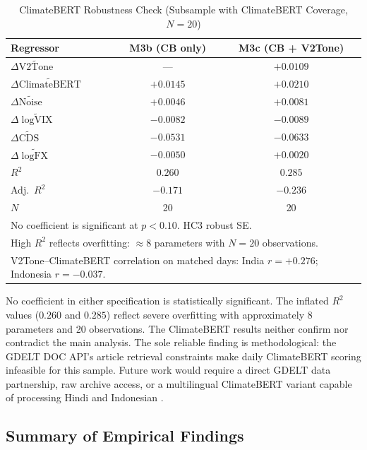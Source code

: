 \documentclass[12pt,a4paper]{article}
\begin{document}
\begin{table}[H]
\centering
\caption{ClimateBERT Robustness Check (Subsample with ClimateBERT Coverage, $N = 20$)}
\label{tab:cb}
\small
\begin{tabular}{lcc}
\toprule
\textbf{Regressor} & \textbf{M3b} (CB only) & \textbf{M3c} (CB + V2Tone) \\
\midrule
$\Delta\widetilde{\text{V2Tone}}$     & ---       & $+0.0109$ \\
$\Delta\widetilde{\text{ClimateBERT}}$ & $+0.0145$ & $+0.0210$ \\
$\Delta\widetilde{\text{Noise}}$      & $+0.0046$ & $+0.0081$ \\
$\Delta\widetilde{\log\text{VIX}}$    & $-0.0082$ & $-0.0089$ \\
$\Delta\widetilde{\text{CDS}}$        & $-0.0531$ & $-0.0633$ \\
$\Delta\widetilde{\log\text{FX}}$     & $-0.0050$ & $+0.0020$ \\
\midrule
$R^2$     & $0.260$ & $0.285$ \\
Adj.\ $R^2$ & $-0.171$ & $-0.236$ \\
$N$       & 20 & 20 \\
\midrule
\multicolumn{3}{l}{\footnotesize No coefficient is significant at $p < 0.10$. HC3 robust SE.} \\
\multicolumn{3}{l}{\footnotesize High $R^2$ reflects overfitting: $\approx$8 parameters with $N = 20$ observations.} \\
\multicolumn{3}{l}{\footnotesize V2Tone--ClimateBERT correlation on matched days: India $r = +0.276$; Indonesia $r = -0.037$.}\\
\bottomrule
\end{tabular}
\end{table}

No coefficient in either specification is statistically significant. The inflated $R^2$ values ($0.260$ and $0.285$) reflect severe overfitting with approximately 8 parameters and 20 observations. The ClimateBERT results neither confirm nor contradict the main analysis. The sole reliable finding is methodological: the GDELT DOC API's article retrieval constraints make daily ClimateBERT scoring infeasible for this sample. Future work would require a direct GDELT data partnership, raw archive access, or a multilingual ClimateBERT variant capable of processing Hindi and Indonesian \citep{Webersinke2022}.

\subsection{Summary of Empirical Findings}
\end{document}
